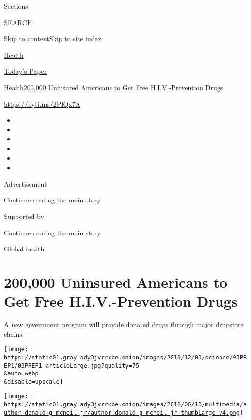 Sections

SEARCH

\protect\hyperlink{site-content}{Skip to
content}\protect\hyperlink{site-index}{Skip to site index}

\href{https://www.nytimes3xbfgragh.onion/section/health}{Health}

\href{https://myaccount.nytimes3xbfgragh.onion/auth/login?response_type=cookie\&client_id=vi}{}

\href{https://www.nytimes3xbfgragh.onion/section/todayspaper}{Today's
Paper}

\href{/section/health}{Health}\textbar{}200,000 Uninsured Americans to
Get Free H.I.V.-Prevention Drugs

\url{https://nyti.ms/2PfQx7A}

\begin{itemize}
\item
\item
\item
\item
\item
\item
\end{itemize}

Advertisement

\protect\hyperlink{after-top}{Continue reading the main story}

Supported by

\protect\hyperlink{after-sponsor}{Continue reading the main story}

Global health

\hypertarget{200000-uninsured-americans-to-get-free-hiv-prevention-drugs}{%
\section{200,000 Uninsured Americans to Get Free H.I.V.-Prevention
Drugs}\label{200000-uninsured-americans-to-get-free-hiv-prevention-drugs}}

A new government program will provide donated drugs through major
drugstore chains.

\texttt{[image: https://static01.graylady3jvrrxbe.onion/images/2019/12/03/science/03PREP1/03PREP1-articleLarge.jpg?quality=75\\\&auto=webp\\\&disable=upscale]}

\href{https://www.nytimes3xbfgragh.onion/by/donald-g-mcneil-jr}{\texttt{[image: https://static01.graylady3jvrrxbe.onion/images/2018/06/13/multimedia/author-donald-g-mcneil-jr/author-donald-g-mcneil-jr-thumbLarge-v4.png]}}

